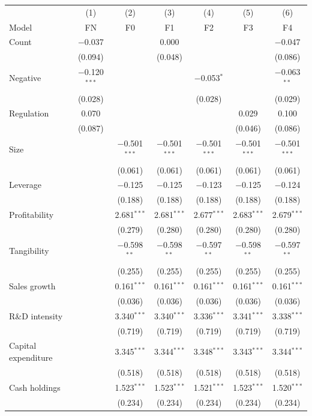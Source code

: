 \begin{tabular}{lcccccc}
\toprule
 & (1) & (2) & (3) & (4) & (5) & (6) \\
Model & FN & F0 & F1 & F2 & F3 & F4 \\
\midrule
Count & $-$0.037 &  & 0.000 &  &  & $-$0.047 \\
 & (0.094) &  & (0.048) &  &  & (0.086) \\
Negative & $-$0.120$^{***}$ &  &  & $-$0.053$^{*}$ &  & $-$0.063$^{**}$ \\
 & (0.028) &  &  & (0.028) &  & (0.029) \\
Regulation & 0.070 &  &  &  & 0.029 & 0.100 \\
 & (0.087) &  &  &  & (0.046) & (0.086) \\
Size &  & $-$0.501$^{***}$ & $-$0.501$^{***}$ & $-$0.501$^{***}$ & $-$0.501$^{***}$ & $-$0.501$^{***}$ \\
 &  & (0.061) & (0.061) & (0.061) & (0.061) & (0.061) \\
Leverage &  & $-$0.125 & $-$0.125 & $-$0.123 & $-$0.125 & $-$0.124 \\
 &  & (0.188) & (0.188) & (0.188) & (0.188) & (0.188) \\
Profitability &  & 2.681$^{***}$ & 2.681$^{***}$ & 2.677$^{***}$ & 2.683$^{***}$ & 2.679$^{***}$ \\
 &  & (0.279) & (0.280) & (0.280) & (0.280) & (0.280) \\
Tangibility &  & $-$0.598$^{**}$ & $-$0.598$^{**}$ & $-$0.597$^{**}$ & $-$0.598$^{**}$ & $-$0.597$^{**}$ \\
 &  & (0.255) & (0.255) & (0.255) & (0.255) & (0.255) \\
Sales growth &  & 0.161$^{***}$ & 0.161$^{***}$ & 0.161$^{***}$ & 0.161$^{***}$ & 0.161$^{***}$ \\
 &  & (0.036) & (0.036) & (0.036) & (0.036) & (0.036) \\
R\&D intensity &  & 3.340$^{***}$ & 3.340$^{***}$ & 3.336$^{***}$ & 3.341$^{***}$ & 3.338$^{***}$ \\
 &  & (0.719) & (0.719) & (0.719) & (0.719) & (0.719) \\
Capital expenditure &  & 3.345$^{***}$ & 3.344$^{***}$ & 3.348$^{***}$ & 3.343$^{***}$ & 3.344$^{***}$ \\
 &  & (0.518) & (0.518) & (0.518) & (0.518) & (0.518) \\
Cash holdings &  & 1.523$^{***}$ & 1.523$^{***}$ & 1.521$^{***}$ & 1.523$^{***}$ & 1.520$^{***}$ \\
 &  & (0.234) & (0.234) & (0.234) & (0.234) & (0.234) \\

\end{tabular}
